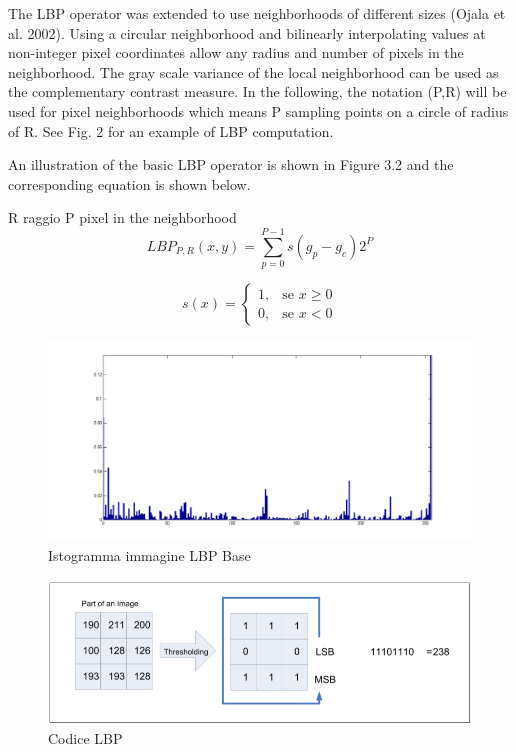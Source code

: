 The LBP operator was extended to use neighborhoods of different sizes (Ojala et al. 2002). Using a circular neighborhood and bilinearly interpolating values at non-integer pixel coordinates allow any radius and number of pixels in the neighborhood. The gray scale variance of the local neighborhood can be used as the complementary contrast measure. In the following, the notation (P,R) will be used for pixel neighborhoods which means P sampling points on a circle of radius of R. See Fig. 2 for an example of LBP computation. 


 An illustration of the basic LBP operator is shown in Figure 3.2
and the corresponding equation is shown below.

R raggio
P pixel in the neighborhood
\begin{equation}
LBP_{P,R}(x, y) = \sum_{p=0}^{P-1}{s(g_p - g_c)2^P}
\end{equation}

\begin{equation}
s(x) = 	\begin{cases} 1, & \mbox{se } x \ge 0 \\ 0, & \mbox{se } x < 0 \end{cases}
\end{equation}

\begin{figure}[ht]
\begin{center}
\includegraphics[width=.95\textwidth]{img/hist-complete}
\caption{ Istogramma immagine LBP Base }
\label{fig:istCompleteLBP}
\end{center}
\end{figure}

\begin{figure}[ht]
\begin{center}
\includegraphics[width=.95\textwidth]{img/LBP_code}
\caption{ Codice LBP }
\label{fig:LBPcode}
\end{center}
\end{figure}



